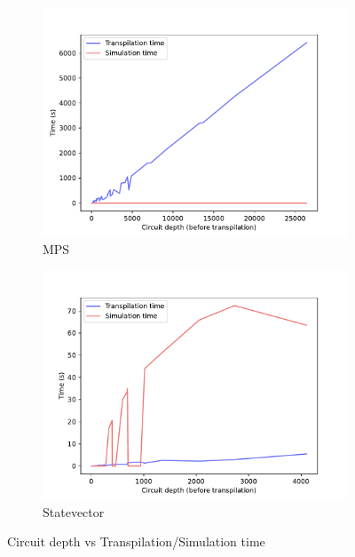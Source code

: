 \documentclass[11pt]{article}
\theoremstyle{definition}
\theoremstyle{remark}
\begin{document}
\begin{figure}[h!]
  \begin{subfigure}{0.48\textwidth}
    \includegraphics[width=\textwidth]{../../results/figures/circuit_depth_v_tran_time_and_sim_time-MPS.pdf}
    \caption{MPS}
  \end{subfigure}
  \begin{subfigure}{0.48\textwidth}
    \includegraphics[width=\textwidth]{../../results/figures/circuit_depth_v_tran_time_and_sim_time-statevector_cpu.pdf}
    \caption{Statevector}
  \end{subfigure}
  \caption{Circuit depth vs Transpilation/Simulation time}
  \label{fig:circuit_depth_of_trans_v_sim}
\end{figure}
\end{document}
